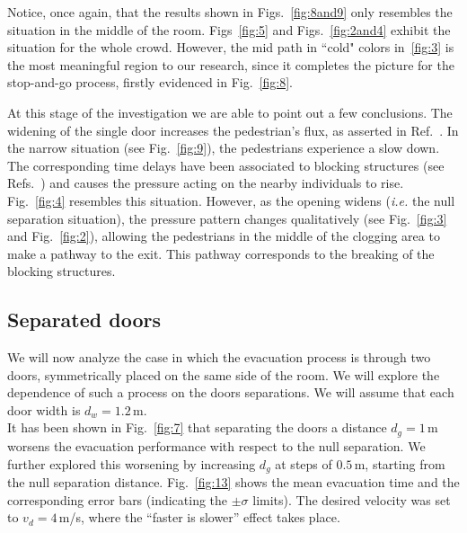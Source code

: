 {\color{red} Notice, once again, that the results shown in Figs.~\ref{fig:8and9} only resembles the 
situation in the middle of the room. Figs~\ref{fig:5} and Figs.~\ref{fig:2and4} exhibit 
the situation for the whole crowd. However, the mid path in ``cold" colors in~\ref{fig:3} is
the most meaningful region to our research, since it completes the picture
for the stop-and-go process, firstly evidenced in Fig.~\ref{fig:8}.
}



At this stage of the investigation we are able to point out a few conclusions. 
The widening of the single door increases the pedestrian's flux, as asserted in 
Ref.~\cite{daoliang1}. In the narrow situation (see Fig.~\ref{fig:9}), 
the pedestrians experience a slow down. The corresponding time delays have been 
associated to blocking structures (see Refs.~\cite{Dorso1,Dorso2}) and causes 
the pressure acting on the nearby individuals to rise. Fig.~\ref{fig:4} 
resembles this situation. However, as the opening widens (\emph{i.e.} the null 
separation situation), the pressure pattern changes qualitatively (see 
Fig.~\ref{fig:3} and Fig.~\ref{fig:2}), allowing the pedestrians in the middle 
of the clogging area to make a pathway to the exit. This pathway corresponds to 
the breaking of the blocking structures.   \\

\subsection{\label{door_seperation} Separated doors}

We will now analyze the case in which the evacuation process is through two 
doors, symmetrically placed on the same side of the room. We will explore the 
dependence of such a process on the doors separations. We will assume that 
each door width is $d_w=1.2\,$m.  \\

It has been shown in Fig.~\ref{fig:7} that separating the doors a distance 
$d_g=1\,$m worsens the evacuation performance with respect to the null 
separation. We  further explored this worsening by increasing $d_g$ at steps of 
$0.5\,$m, starting from the null separation distance. Fig.~\ref{fig:13} shows 
the mean evacuation time and the corresponding error bars (indicating the 
$\pm\sigma$ limits). The desired velocity was set to $v_d=4\,$m/s, where the 
``faster is slower'' effect takes place. \\

